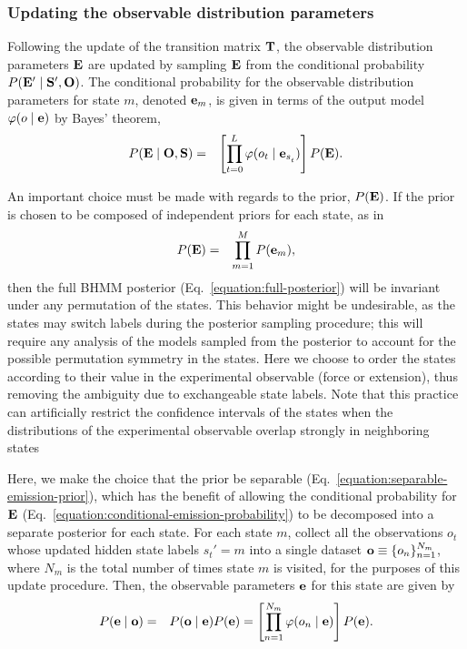 \documentclass[aps,pre,twocolumn,superscriptaddress,nofootinbib,longbibliography]{revtex4-1}
\newcommand{\bfm}[1]{{\bf #1}}
\begin{document}
{%
\subsubsection{Updating the observable distribution parameters}

Following the update of the transition matrix $\bfm{T}$, the observable distribution parameters $\bfm{E}$ are updated by sampling $\bfm{E}$ from the conditional probability $P(\bfm{E}' \mid \bfm{S}', \bfm{O})$.
The conditional probability for the observable distribution parameters for state $m$, denoted $\bfm{e}_m$, is given in terms of the output model $\varphi(o \mid \bfm{e})$ by Bayes' theorem,
\begin{eqnarray}
P(\bfm{E} \mid \bfm{O}, \bfm{S}) &=& \left[\prod_{t=0}^{L^{}} \varphi(o_{t} \mid \bfm{e}_{s^{}_{t}}) \right] P(\bfm{E}) \label{equation:conditional-emission-probability} .
\end{eqnarray}

An important choice must be made with regards to the prior, $P(\bfm{E})$.
If the prior is chosen to be composed of independent priors for each state, as in
\begin{eqnarray}
P(\bfm{E}) &=& \prod_{m=1}^M P(\bfm{e}_m) \label{equation:separable-emission-prior} ,
\end{eqnarray}
then the full BHMM posterior (Eq.~\ref{equation:full-posterior}) will be invariant under any permutation of the states.
This behavior might be undesirable, as the states may switch labels during the posterior sampling procedure; this will require any analysis of the models sampled from the posterior to account for the possible permutation symmetry in the states.
{\color{magenta}Here we choose to order the states according to their value in the experimental observable (force or extension), thus removing
the ambiguity due to exchangeable state labels. Note that this practice can artificially restrict the confidence intervals of the states when 
the distributions of the experimental observable overlap strongly in neighboring states}


Here, we make the choice that the prior be separable (Eq.~\ref{equation:separable-emission-prior}), which has the benefit of allowing the conditional probability for $\bfm{E}$ (Eq.~\ref{equation:conditional-emission-probability}) to be decomposed into a separate posterior for each state.
For each state $m$, collect all the observations $o^{}_{t}$ whose updated hidden state labels ${s^{}_{t}}' = m$ into a single dataset $\bfm{o} \equiv \{o_n\}_{n=1}^{N_m}$, where $N_m$ is the total number of times state $m$ is visited, for the purposes of this update procedure.
Then, the observable parameters $\bfm{e}$ for this state are given by
\begin{eqnarray}
P(\bfm{e} \mid \bfm{o}) &=& P(\bfm{o} \mid \bfm{e}) P(\bfm{e}) = \left[ \prod_{n=1}^{N_m} \varphi(o_n \mid \bfm{e}) \right] P(\bfm{e}) .
\end{eqnarray}

}
\end{document}
